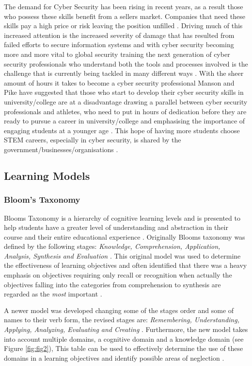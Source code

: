 \documentclass[12pt,a4paper]{article}
\begin{document}
The demand for Cyber Security has been rising in recent years, as a result those who possess these skills benefit from a sellers market. Companies that need these skills pay a high price or risk leaving the position unfilled \cite{libicki2014hackers}. Driving much of this increased attention is the increased severity of damage that has resulted from failed efforts to secure information systems \cite{albert2010high2} and with cyber security becoming more and more vital to global security \cite{nagarajan2012exploring6} training the next generation of cyber security professionals who understand both the tools and processes involved is the challenge that is currently being tackled in many different ways \cite{buchanan2011blending3}. With the sheer amount of hours it takes to become a cyber security professional Manson and Pike have suggested that those who start to develop their cyber security skills in university/college are at a disadvantage drawing a parallel between cyber security professionals and athletes, who need to put in hours of dedication before they are ready to pursue a career in university/college and emphasising the importance of engaging students at a younger age \cite{manson2014case}. This hope of having more students choose STEM careers, especially in cyber security, is shared by the government/businesses/organisations \cite{albert2010high4}. 

 
\subsection{Learning Models}
\subsubsection{Bloom's Taxonomy} 
Blooms Taxonomy is a hierarchy of cognitive learning levels and is presented to help students have a greater level of understanding and abstraction in their course and their entire educational experience \cite{bloom1965bloom}. Originally Blooms taxonomy was defined by the following stages: \emph{Knowledge, Comprehension, Application, Analysis, Synthesis and Evaluation} \cite{anderson1994bloom}. This original model was used to determine the effectiveness of learning objectives and often identified that there was a heavy emphasis on objectives requiring only recall or recognition when actually the objectives falling into the categories from comprehension to synthesis are regarded as the \emph{most} important \cite{krathwohl2002revision}.  


A newer model was developed changing some of the stages order and some of names to their verb form, the revised stages are: \emph{Remembering, Understanding, Applying, Analyzing, Evaluating and Creating} \cite{forehand2010bloom}. Furthermore, the new model takes into account multiple domains, a cognitive domain and a knowledge domain (see Figure \ref{fig:fig2}),  This table can be used to effectively determine the use of these domains in a learning objectives and identify possible areas of neglection \cite{krathwohl2002revision2}. 
\end{document}
